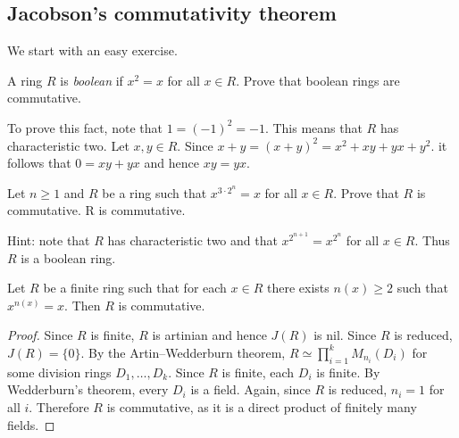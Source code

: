 \subsection{Jacobson's commutativity theorem}

We start with an easy exercise. 

\begin{exercise}
    \label{xca:x^2=x}
    A ring $R$ is \emph{boolean} if $x^2=x$ for all $x\in R$. 
    Prove that boolean rings are commutative. 
\end{exercise}

To prove this fact, note that $1=(-1)^2=-1$. This means that $R$ has
characteristic two. Let $x,y\in R$. Since $x+y=(x+y)^2=x^2+xy+yx+y^2$. 
it follows that $0=xy+yx$ and hence $xy=yx$.

%

\begin{exercise}
\label{xca:x32^n=x}
Let $n\geq1$ and $R$ be a ring 
such that $x^{3\cdot 2^n}=x$ for all $x\in R$. 
Prove that $R$ is commutative.  R is commutative.
\end{exercise}

Hint: note that $R$ has characteristic two and 
that 
$x^{2^{n+1}}=x^{2^n}$ for all $x\in R$. Thus 
$R$ is a boolean ring. 

\begin{proposition}
\label{pro:Jacobson}
    Let $R$ be a finite ring such that 
    for each $x\in R$ there exists $n(x)\geq2$ such that 
    $x^{n(x)}=x$. Then $R$ is commutative. 
\end{proposition}

\begin{proof}
    Since $R$ is finite, $R$ is artinian and hence $J(R)$ is nil. 
    Since $R$ is reduced, $J(R)=\{0\}$. 
    By the Artin--Wedderburn theorem, $R\simeq\prod_{i=1}^k M_{n_i}(D_i)$ for some division rings $D_1,\dots,D_k$. 
    Since $R$ is finite, each $D_i$ is finite. By Wedderburn's theorem,
    every $D_i$ is a field. Again, since $R$ is reduced, 
    $n_i=1$ for all $i$. Therefore $R$ is commutative, as it is 
    a direct product of finitely many fields.
\end{proof}

